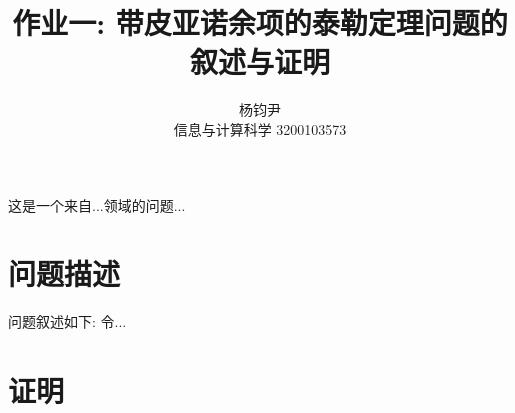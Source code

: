 \documentclass{ctexart}
\title{作业一: 带皮亚诺余项的泰勒定理问题的\\叙述与证明}
\author{杨钧尹 \\ 信息与计算科学 3200103573}
\begin{document}
\maketitle


这是一个来自...领域的问题...
\section{问题描述}
问题叙述如下: 令...

\section{证明}
\end{document}
